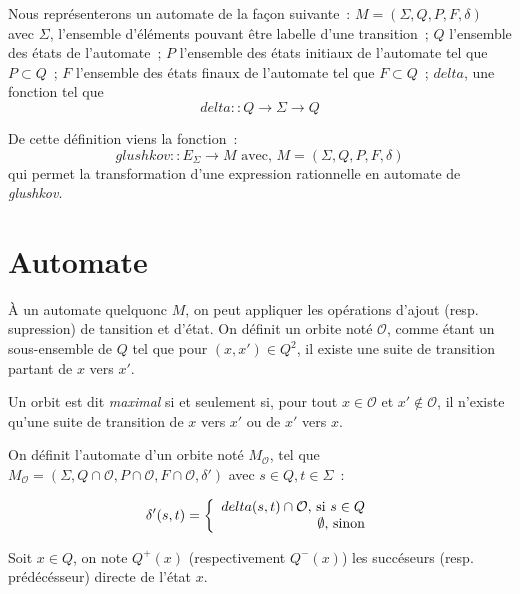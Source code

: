 \documentclass{article}
\begin{document}
Nous représenterons un automate de la façon suivante~: 
\(M = (\Sigma, Q, P, F, \delta)\) avec \(\Sigma\), l'ensemble d'éléments pouvant 
être labelle d'une transition~; 
\(Q\) l'ensemble des états de l'automate~; 
\(P\) l'ensemble des états initiaux de l'automate tel que \(P \subset Q\)~; 
\(F\) l'ensemble des états finaux de l'automate tel que \(F \subset Q\)~; 
\(delta\), une fonction tel que
\[
  delta :: Q \to \Sigma \to Q
\]

De cette définition viens la fonction~:
\[
  glushkov :: E_{\Sigma} \to M \text{ avec, } M = (\Sigma, Q, P, F, \delta)
\]
qui permet la transformation d'une expression rationnelle en automate de 
\textit{glushkov}.


\section{Automate}

À un automate quelquonc \(M\), on peut appliquer les opérations d'ajout (resp. 
supression) de tansition et d'état. On définit un orbite noté \(\mathcal{O}\), 
comme étant un sous-ensemble de \(Q\) tel que pour \((x, x') \in Q^2\), il 
existe une suite de transition partant de \(x\) vers \(x'\).

Un orbit est dit \textit{maximal} si et seulement si, pour tout 
\(x \in \mathcal{O}\) et \(x' \notin \mathcal{O}\), il n'existe qu'une suite de 
transition de \(x\) vers \(x'\) ou de \(x'\) vers \(x\).

On définit l'automate d'un orbite noté \(M_{\mathcal{O}}\), tel que 
\(M_{\mathcal{O}} = (\Sigma, Q \cap \mathcal{O}, P \cap \mathcal{O}, F \cap \mathcal{O}, 
\delta')\) avec \(s \in Q, t \in \Sigma\)~:

\[
  \delta'(s, t) =    \left \{
    \begin{array}{r c l}
      delta(s, t) \cap \mathcal{O} \text{, si } s \in Q \\ 
      \emptyset \text{, sinon} \\
    \end{array}
    \right .
\]

Soit \(x \in Q\), on note \(Q^{+}(x)\) (respectivement \(Q^{-}(x)\)) les 
succéseurs (resp. prédécésseur) directe de l'état \(x\). 
\end{document}
